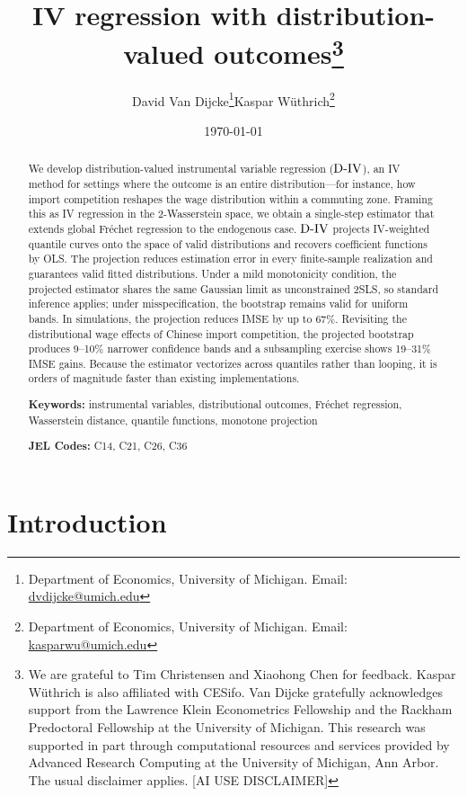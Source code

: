 \documentclass[12pt]{article}
\title{IV regression with distribution-valued outcomes\thanks{We are grateful to Tim Christensen and Xiaohong Chen for feedback. Kaspar W\"uthrich is also affiliated with CESifo. Van Dijcke gratefully acknowledges support from the Lawrence Klein Econometrics Fellowship and the Rackham Predoctoral Fellowship at the University of Michigan. This research was supported in part through computational resources and services provided by Advanced Research Computing at the University of Michigan, Ann Arbor. The usual disclaimer applies. [AI USE DISCLAIMER]}}
\author{David Van Dijcke\thanks{Department of Economics, University of Michigan. Email: \url{dvdijcke@umich.edu}}\quad \quad Kaspar W\"uthrich\thanks{Department of Economics, University of Michigan. Email: \url{kasparwu@umich.edu}}} %
\date{\today}
\newcommand{\est}{\ensuremath{\textnormal{D-IV}}\xspace}
\begin{document}
\maketitle

\begin{abstract}
We develop distribution-valued instrumental variable regression (\est), an IV method for settings where the outcome is an entire distribution---for instance, how import competition reshapes the wage distribution within a commuting zone. Framing this as IV regression in the 2-Wasserstein space, we obtain a single-step estimator that extends global Fr\'echet regression to the endogenous case. \est projects IV-weighted quantile curves onto the space of valid distributions and recovers coefficient functions by OLS. The projection reduces estimation error in every finite-sample realization and guarantees valid fitted distributions. Under a mild monotonicity condition, the projected estimator shares the same Gaussian limit as unconstrained 2SLS, so standard inference applies; under misspecification, the bootstrap remains valid for uniform bands. In simulations, the projection reduces IMSE by up to 67\%. Revisiting the distributional wage effects of Chinese import competition, the projected bootstrap produces 9--10\% narrower confidence bands and a subsampling exercise shows 19--31\% IMSE gains. Because the estimator vectorizes across quantiles rather than looping, it is orders of magnitude faster than existing implementations.

\medskip
\noindent \textbf{Keywords:} instrumental variables, distributional outcomes, Fr\'echet regression, Wasserstein distance, quantile functions, monotone projection

\medskip
\noindent \textbf{JEL Codes:} C14, C21, C26, C36


\end{abstract}

\newpage


\section{Introduction} 
\end{document}
